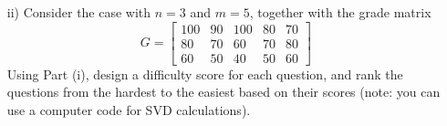 \begin{homeworkProblem}
\begin{itemize}
        \item [ii)] Consider the case with $n=3$ and $m=5$, together with the 
        grade matrix
        \begin{equation}
            G=\left[\begin{array}{ccccc} 100 & 90 & 100 & 80 & 70 \\ 
            80 & 70& 60& 70& 80\\ 60& 50& 40& 50 & 60 \end{array}\right]
        \end{equation}
        Using Part (i), design a difficulty score for each question, and rank 
        the questions from the hardest to the easiest based on their scores 
        (note: you can use a computer code for SVD calculations). 

    \end{itemize}

    \begin{solution}
    \end{solution}

\end{homeworkProblem}